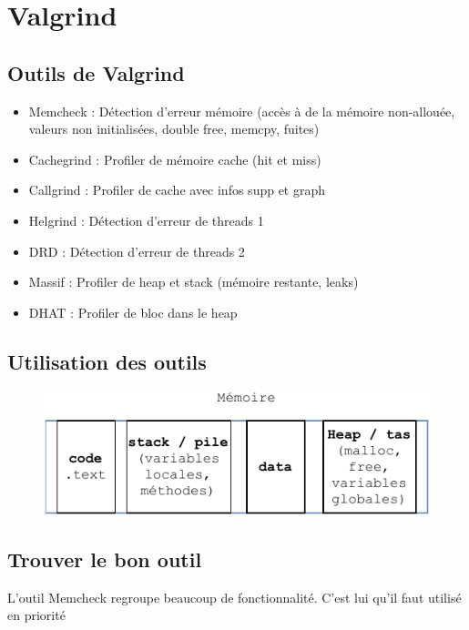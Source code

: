\documentclass[resume]{subfiles}
\begin{document}
\section{Valgrind}

\subsection{Outils de Valgrind}
\begin{itemize}
\item Memcheck : Détection d'erreur mémoire (accès à de la mémoire non-allouée, valeurs non initialisées, double free, memcpy, fuites) 
\item Cachegrind : Profiler de mémoire cache (hit et miss)
\item Callgrind : Profiler de cache avec infos supp et graph
\item Helgrind : Détection d'erreur de threads 1
\item DRD : Détection d'erreur de threads 2
\item Massif : Profiler de heap et stack (mémoire restante, leaks)
\item DHAT : Profiler de bloc dans le heap
\end{itemize}

\subsection{Utilisation des outils}
\begin{figure}[H]
    \centering
    \includegraphics[width=0.6\columnwidth, page=2]{Schemas-crop.pdf}
\end{figure}

\subsection{Trouver le bon outil}
L'outil Memcheck regroupe beaucoup de fonctionnalité. C'est lui qu'il faut utilisé en priorité
\end{document}
